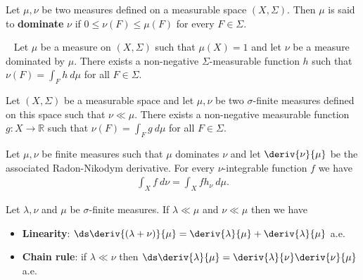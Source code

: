     \begin{definition}
            Let $\mu, \nu$ be two measures defined on a measurable space $(X, \Sigma)$. Then $\mu$ is said to \textbf{dominate} $\nu$ if $0\leq\nu(F)\leq\mu(F)$ for every $F\in\Sigma$.
    \end{definition}

    \begin{theorem}~\newline
        Let $\mu$ be a measure on $(X, \Sigma)$ such that $\mu(X) = 1$ and let $\nu$ be a measure dominated by $\mu$. There exists a non-negative $\Sigma$-measurable function $h$ such that $\nu(F) = \int_F h\ d\mu$ for all $F\in\Sigma$.
    \end{theorem}


    \begin{theorem}
        Let $(X,\Sigma)$ be a measurable space and let $\mu,\nu$ be two $\sigma$-finite measures defined on this space such that $\nu\ll\mu$. There exists a non-negative measurable function $g:X\rightarrow\mathbb{R}$ such that $\nu(F) = \int_F g\ d\mu$ for all $F\in\Sigma$.
    \end{theorem}

    \begin{property}
        Let $\mu, \nu$ be finite measures such that $\mu$ dominates $\nu$ and let $\deriv{\nu}{\mu}$ be the associated Radon-Nikodym derivative. For every $\nu$-integrable function $f$ we have
        \begin{gather}
            \int_X f\ d\nu = \int_X fh_\nu\ d\mu.
        \end{gather}
    \end{property}

    \begin{property}
        Let $\lambda,\nu$ and $\mu$ be $\sigma$-finite measures. If $\lambda\ll\mu$ and $\nu\ll\mu$ then we have
        \begin{itemize}
            \item \textbf{Linearity}: $\ds\deriv{(\lambda+\nu)}{\mu} = \deriv{\lambda}{\mu} + \deriv{\lambda}{\mu}$ a.e.
            \item \textbf{Chain rule}: if $\lambda\ll\nu$ then $\ds\deriv{\lambda}{\mu} = \deriv{\lambda}{\nu}\deriv{\nu}{\mu}$ a.e.
        \end{itemize}
    \end{property}